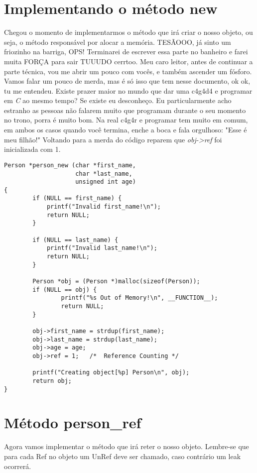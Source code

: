 \section{Implementando o método new}

Chegou o momento de implementarmos o método que irá criar o nosso objeto, ou seja, o método responsável por alocar a memória. TESÃOOO, já sinto um friozinho na barriga, OPS!
Terminarei de escrever essa parte no banheiro e farei muita FORÇA para sair TUUUDO cerrtoo. Meu caro leitor, antes de continuar a parte técnica, vou me abrir um pouco com 
vocês, e também ascender um fósforo. Vamos falar um pouco de merda, mas é só isso que tem nesse documento, ok ok, tu me entendeu. Existe prazer maior no mundo que dar uma 
c4g4d4 e programar em \textit{C} ao mesmo tempo? Se existe eu desconheço. Eu particularmente acho estranho as pessoas não falarem muito que programam durante o seu momento no
trono, porra é muito bom. Na real c4g4r e programar tem muito em comum, em ambos os casos quando você termina, enche a boca e fala orgulhoso: "Esse é meu filhão!" Voltando para a
merda do código reparem que \textit{obj->ref} foi inicializada com 1.

\belowcaptionskip=-10pt
\begin{lstlisting}[label=some-code,caption=person\_new()]
Person *person_new (char *first_name, 
                    char *last_name, 
                    unsigned int age)
{
        if (NULL == first_name) {
            printf("Invalid first_name!\n");
            return NULL;
        }

        if (NULL == last_name) {
            printf("Invalid last_name!\n");
            return NULL;
        }

        Person *obj = (Person *)malloc(sizeof(Person));
        if (NULL == obj) {
                printf("%s Out of Memory!\n", __FUNCTION__);
                return NULL;
        }

        obj->first_name = strdup(first_name);
        obj->last_name = strdup(last_name);
        obj->age = age;
        obj->ref = 1;   /*  Reference Counting */

        printf("Creating object[%p] Person\n", obj);
        return obj;
}

\end{lstlisting}

\vspace{50mm}

\section{Método person\_ref}
Agora vamos implementar o método que irá reter o nosso objeto. Lembre-se que para cada Ref no objeto um UnRef deve ser chamado, caso contrário um leak ocorrerá.

